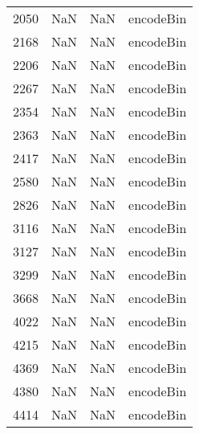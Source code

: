 \begin{tabular}{llll}
2050 &                   NaN &                        NaN &                                 encodeBin \\
2168 &                   NaN &                        NaN &                                 encodeBin \\
2206 &                   NaN &                        NaN &                                 encodeBin \\
2267 &                   NaN &                        NaN &                                 encodeBin \\
2354 &                   NaN &                        NaN &                                 encodeBin \\
2363 &                   NaN &                        NaN &                                 encodeBin \\
2417 &                   NaN &                        NaN &                                 encodeBin \\
2580 &                   NaN &                        NaN &                                 encodeBin \\
2826 &                   NaN &                        NaN &                                 encodeBin \\
3116 &                   NaN &                        NaN &                                 encodeBin \\
3127 &                   NaN &                        NaN &                                 encodeBin \\
3299 &                   NaN &                        NaN &                                 encodeBin \\
3668 &                   NaN &                        NaN &                                 encodeBin \\
4022 &                   NaN &                        NaN &                                 encodeBin \\
4215 &                   NaN &                        NaN &                                 encodeBin \\
4369 &                   NaN &                        NaN &                                 encodeBin \\
4380 &                   NaN &                        NaN &                                 encodeBin \\
4414 &                   NaN &                        NaN &                                 encodeBin \\

\end{tabular}
